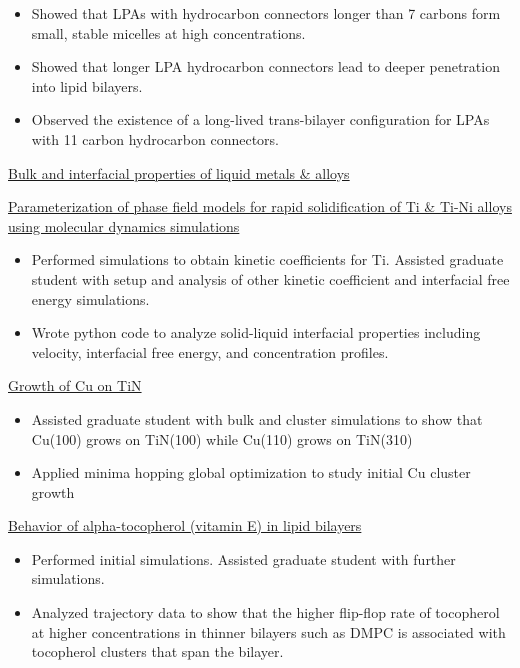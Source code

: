 \begin{cventries}
{\begin{cvitems}
\begin{itemize}
            \item {Showed that LPAs with hydrocarbon connectors longer than 7 carbons form small, stable micelles at high concentrations.}
            \item {Showed that longer LPA hydrocarbon connectors lead to deeper penetration into lipid bilayers.}
            \item {Observed the existence of a long-lived trans-bilayer configuration for LPAs with 11 carbon hydrocarbon connectors.}
            \end{itemize}
        \item {\underline{Bulk and interfacial properties of liquid metals \& alloys}}
        \item {\underline{Parameterization of phase field models for rapid solidification of Ti \& Ti-Ni alloys using molecular dynamics simulations}}
            \begin{itemize}
            \item {Performed simulations to obtain kinetic coefficients for Ti. Assisted graduate student with setup and analysis of other kinetic coefficient and interfacial free energy simulations.}
            \item {Wrote python code to analyze solid-liquid interfacial properties including velocity, interfacial free energy, and concentration profiles.}
            \end{itemize}
        \item {\underline{Growth of Cu on TiN}}
            \begin{itemize}
            \item {Assisted graduate student with bulk and cluster simulations to show that Cu(100) grows on TiN(100) while Cu(110) grows on TiN(310)}
            \item {Applied minima hopping global optimization to study initial Cu cluster growth}
            \end{itemize}
        \item {\underline{Behavior of alpha-tocopherol (vitamin E) in lipid bilayers}}
            \begin{itemize}
            \item {Performed initial simulations. Assisted graduate student with further simulations.}
            \item {Analyzed trajectory data to show that the higher flip-flop rate of tocopherol at higher concentrations in thinner bilayers such as DMPC is associated with tocopherol clusters that span the bilayer.}

\end{itemize}
\end{cvitems}}
\end{cventries}
